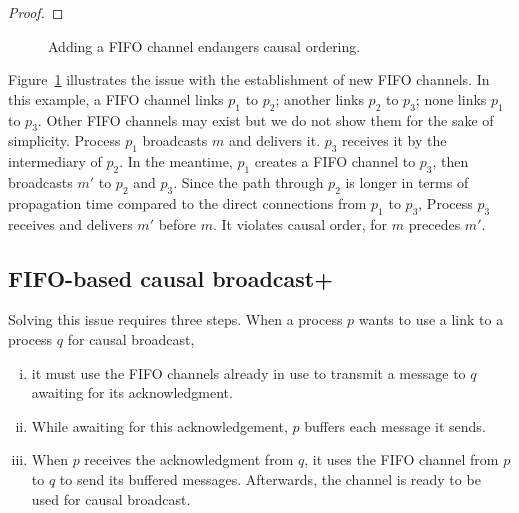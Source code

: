 \begin{theorem}
\end{theorem}

\begin{proof}
\end{proof}

\begin{figure}
  \begin{center}
    
    \caption{\label{fig:problem}Adding a FIFO channel endangers causal
      ordering.}
  \end{center}
\end{figure}

Figure~\ref{fig:problem} illustrates the issue with the establishment of new
FIFO channels. In this example, a FIFO channel links $p_1$ to $p_2$; another
links $p_2$ to $p_3$; none links $p_1$ to $p_3$. Other FIFO channels may exist
but we do not show them for the sake of simplicity. Process $p_1$ broadcasts $m$
and delivers it. $p_3$ receives it by the intermediary of $p_2$. In the
meantime, $p_1$ creates a FIFO channel to $p_3$, then broadcasts $m'$ to $p_2$
and $p_3$. Since the path through $p_2$ is longer in terms of propagation time
compared to the direct connections from $p_1$ to $p_3$, Process $p_3$ receives
and delivers $m'$ before $m$. It violates causal order, for $m$ precedes $m'$.

\subsection{FIFO-based causal broadcast+}
\label{subsec:bufferbroadcast}

Solving this issue requires three steps. When a process $p$ wants to use a link to
a process $q$ for causal broadcast,
\begin{enumerate}[(i)]
\item it must use the FIFO channels already in use to transmit a message to $q$
  awaiting for its acknowledgment.
\item While awaiting for this acknowledgement, $p$ buffers each message it
  sends.
\item When $p$ receives the acknowledgment from $q$, it uses the FIFO channel
  from $p$ to $q$ to send its buffered messages. Afterwards, the channel is
  ready to be used for causal broadcast.
\end{enumerate}

